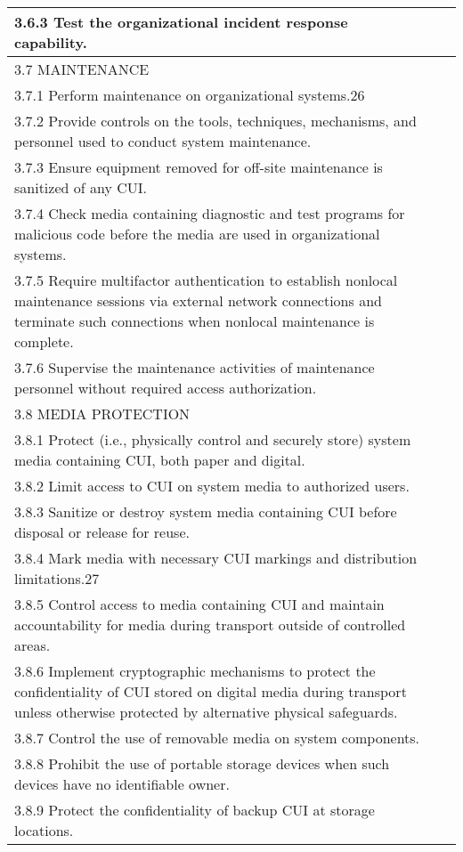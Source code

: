 \begin{longtable} {|p{}|p{}|p{} |}
{3.6.3 Test the organizational incident response capability.}&& \\ \hline
{3.7 MAINTENANCE}&& \\ \hline
{3.7.1 Perform maintenance on organizational systems.26}&& \\ \hline
{3.7.2 Provide controls on the tools, techniques, mechanisms, and personnel used to conduct system maintenance.}&& \\ \hline
{3.7.3 Ensure equipment removed for off-site maintenance is sanitized of any CUI.}&& \\ \hline
{3.7.4 Check media containing diagnostic and test programs for malicious code before the media are used in organizational systems.}&& \\ \hline
{3.7.5 Require multifactor authentication to establish nonlocal maintenance sessions via external network connections and terminate such connections when nonlocal maintenance is complete.}&& \\ \hline
{3.7.6 Supervise the maintenance activities of maintenance personnel without required access authorization.}&& \\ \hline
{3.8 MEDIA PROTECTION}&& \\ \hline
{3.8.1 Protect (i.e., physically control and securely store) system media containing CUI, both paper and digital.}&& \\ \hline
{3.8.2 Limit access to CUI on system media to authorized users.}&& \\ \hline
{3.8.3 Sanitize or destroy system media containing CUI before disposal or release for reuse.}&& \\ \hline
{3.8.4 Mark media with necessary CUI markings and distribution limitations.27}&& \\ \hline
{3.8.5 Control access to media containing CUI and maintain accountability for media during transport outside of controlled areas.}&& \\ \hline
{3.8.6 Implement cryptographic mechanisms to protect the confidentiality of CUI stored on digital media during transport unless otherwise protected by alternative physical safeguards.}&& \\ \hline
{3.8.7 Control the use of removable media on system components.}&& \\ \hline
{3.8.8 Prohibit the use of portable storage devices when such devices have no identifiable owner.}&& \\ \hline
{3.8.9 Protect the confidentiality of backup CUI at storage locations.}&& \\ \hline

\end{longtable}
